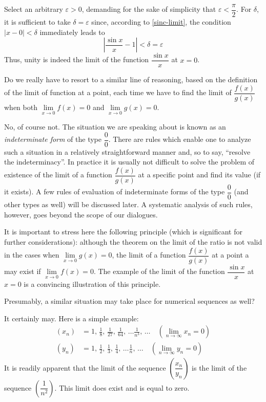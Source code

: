 {Select an arbitrary $\varepsilon > 0$, demanding for the sake of
simplicity that $\varepsilon < \dfrac{\pi}{2}$. For $\delta$, it is sufficient to take $\delta  =	\varepsilon$  since, according to \eqref{sinc-limit}, the condition $| x - 0 | < \delta$ immediately leads to
\begin{equation*}%
 \left| \frac{\sin x}{x} - 1 \right|  < \delta = \varepsilon
\end{equation*}
Thus, unity is indeed the limit of the function $ \dfrac{\sin x}{x}$ at
$x = 0$. 

\rdr Do we really have to resort to a similar line
of reasoning, based on the definition of the limit of function
at a point, each time we have to find the limit of $ \dfrac{f(x)}{g(x)}$
when both $\lim\limits_{x \to 0} f(x) = 0$ and $\lim\limits_{x \to 0} g(x) = 0$.

\athr No, of course not. The situation we are speaking about is known as an \emph{indeterminate form} of the type $\dfrac{0}{0}$. There are rules which enable one to analyze such a situation in a relatively straightforward manner and, so to say, ``resolve the indeterminacy''. In practice it is usually not difficult to solve the problem of existence of the limit of a function $ \dfrac{f(x)}{g(x)}$ at a specific point and find its value (if it exists). A few rules of evaluation of indeterminate forms of the type $\dfrac{0}{0}$ (and other types as well) will be discussed later. A systematic analysis of such rules, however, goes beyond the scope of our dialogues.

It is important to stress here the following principle (which is significant for further considerations): although the theorem on the limit of the ratio is not valid in the cases when $\lim\limits_{x \to 0} g(x) = 0$, the limit of a function  $\dfrac{f(x)}{g(x)}$ at a point a may exist if $\lim\limits_{x \to 0} f(x) = 0$. The example of the limit of the function  $ \dfrac{\sin x}{x}$ at $x = 0$  is a convincing
illustration of this principle.

\rdr Presumably, a similar situation may take place for numerical sequences as well?

\athr It certainly may. Here is a simple example: 
\begin{align*}%
(x_{n}) & = 1, \, \frac{1}{8}, \, \frac{1}{27}, \,\frac{1}{64}, \, \ldots \frac{1}{n^{3}}, \, \ldots \quad (\lim\limits_{n \to \infty} x_{n} = 0) \\
(y_{n}) & = 1, \, \frac{1}{2}, \, \frac{1}{3}, \,\frac{1}{4}, \, \ldots \frac{1}{n}, \, \ldots \quad (\lim\limits_{n \to \infty} y_{n} = 0)
\end{align*}
It is readily apparent that the limit of the sequence $ \left(\dfrac{x_{n}}{y_{n}}\right)$ is the limit of the sequence $ \left(\dfrac{1}{n^{2}}\right)$. This limit does exist and is equal to zero.

}
